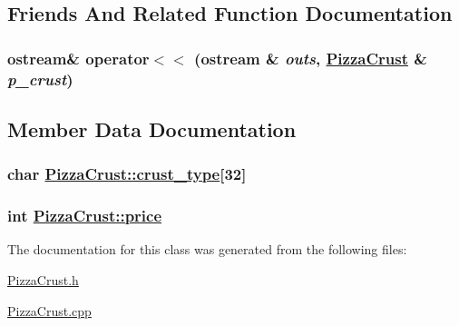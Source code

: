 \subsection{Friends And Related Function Documentation}
\hypertarget{class_pizza_crust_07175b634a5d3de09efbf91a6a782d36}{
\subsubsection[operator$<$$<$]{\setlength{\rightskip}{0pt plus 5cm}ostream\& operator$<$$<$ (ostream \& {\em outs}, \hyperlink{class_pizza_crust}{Pizza\-Crust} \& {\em p\_\-crust})}}
\label{class_pizza_crust_07175b634a5d3de09efbf91a6a782d36}




\subsection{Member Data Documentation}
\hypertarget{class_pizza_crust_91fd485033455873cfc268875c70012f}{
\subsubsection[crust\_\-type]{\setlength{\rightskip}{0pt plus 5cm}char \hyperlink{class_pizza_crust_91fd485033455873cfc268875c70012f}{Pizza\-Crust::crust\_\-type}\mbox{[}32\mbox{]}}}
\label{class_pizza_crust_91fd485033455873cfc268875c70012f}


\hypertarget{class_pizza_crust_78a5eb43deef9a7b5b9ce157b9d52ac4}{
\subsubsection[price]{\setlength{\rightskip}{0pt plus 5cm}int \hyperlink{class_pizza_crust_78a5eb43deef9a7b5b9ce157b9d52ac4}{Pizza\-Crust::price}}}
\label{class_pizza_crust_78a5eb43deef9a7b5b9ce157b9d52ac4}




The documentation for this class was generated from the following files:\begin{CompactItemize}
\item 
\hyperlink{_pizza_crust_8h}{Pizza\-Crust.h}\item 
\hyperlink{_pizza_crust_8cpp}{Pizza\-Crust.cpp}\end{CompactItemize}
